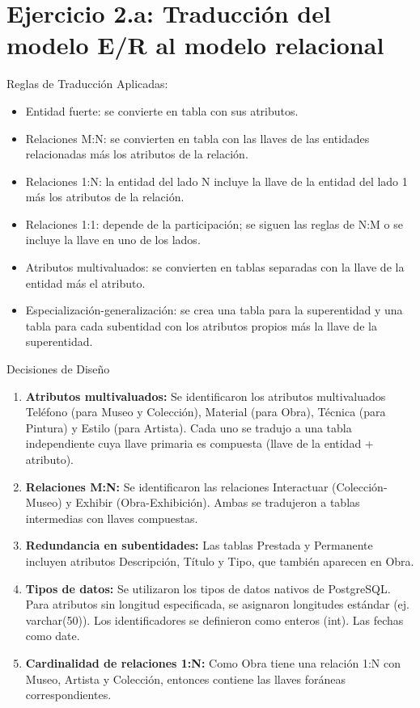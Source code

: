

\section{Ejercicio 2.a: Traducción del modelo E/R al modelo relacional}

Reglas de Traducción Aplicadas:
\begin{itemize}
    \item Entidad fuerte: se convierte en tabla con sus atributos.
    \item Relaciones M:N: se convierten en tabla con las llaves de las entidades relacionadas más los atributos de la relación.
    \item Relaciones 1:N: la entidad del lado N incluye la llave de la entidad del lado 1 más los atributos de la relación.
    \item Relaciones 1:1: depende de la participación; se siguen las reglas de N:M o se incluye la llave en uno de los lados.
    \item Atributos multivaluados: se convierten en tablas separadas con la llave de la entidad más el atributo.
    \item Especialización-generalización: se crea una tabla para la superentidad y una tabla para cada subentidad con los atributos propios más la llave de la superentidad.
\end{itemize}

Decisiones de Diseño
\begin{enumerate}
    \item \textbf{Atributos multivaluados:} Se identificaron los atributos multivaluados Teléfono (para Museo y Colección), Material (para Obra), Técnica (para Pintura) y Estilo (para Artista). Cada uno se tradujo a una tabla independiente cuya llave primaria es compuesta (llave de la entidad + atributo).
    \item \textbf{Relaciones M:N:} Se identificaron las relaciones Interactuar (Colección-Museo) y Exhibir (Obra-Exhibición). Ambas se tradujeron a tablas intermedias con llaves compuestas.
    \item \textbf{Redundancia en subentidades:} Las tablas Prestada y Permanente incluyen atributos Descripción, Título y Tipo, que también aparecen en Obra. 
    \item \textbf{Tipos de datos:} Se utilizaron los tipos de datos nativos de PostgreSQL. Para atributos sin longitud especificada, se asignaron longitudes estándar (ej. varchar(50)). Los identificadores se definieron como enteros (int). Las fechas como date.
    \item \textbf{Cardinalidad de relaciones 1:N:} Como Obra tiene una relación 1:N con Museo, Artista y Colección, entonces contiene las llaves foráneas correspondientes.
\end{enumerate}

